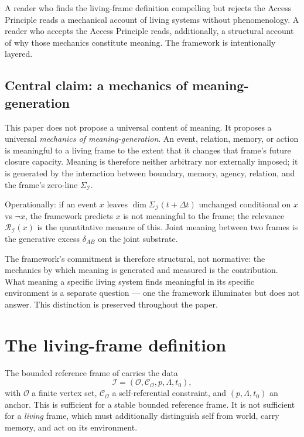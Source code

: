 \documentclass[11pt]{article}
\theoremstyle{plain}
\theoremstyle{definition}
\theoremstyle{remark}
\newcommand{\Ical}{\mathcal{I}}
\newcommand{\Ocal}{\mathcal{O}}
\newcommand{\Ccal}{\mathcal{C}}
\newcommand{\Rcal}{\mathcal{R}}
\begin{document}
A reader who finds the living-frame definition compelling but rejects the Access Principle reads a mechanical account of living systems without phenomenology. A reader who accepts the Access Principle reads, additionally, a structural account of why those mechanics constitute meaning. The framework is intentionally layered.

\subsection{Central claim: a mechanics of meaning-generation}\label{sec:central-claim}

This paper does not propose a universal content of meaning. It proposes
a universal \emph{mechanics of meaning-generation}. An event, relation,
memory, or action is meaningful to a living frame to the extent that it
changes that frame's future closure capacity. Meaning is therefore
neither arbitrary nor externally imposed; it is generated by the
interaction between boundary, memory, agency, relation, and the frame's
zero-line $\Sigma_\Ical$.

Operationally: if an event $x$ leaves $\dim \Sigma_\Ical(t + \Delta t)$
unchanged conditional on $x$ vs $\neg x$, the framework predicts $x$ is
not meaningful to the frame; the relevance $\Rcal_\Ical(x)$ is the
quantitative measure of this. Joint meaning between two frames is the
generative excess $\delta_{AB}$ on the joint substrate.

The framework's commitment is therefore structural, not normative: the
mechanics by which meaning is generated and measured is the contribution.
What meaning a specific living system finds meaningful in its
specific environment is a separate question --- one the framework
illuminates but does not answer. This distinction is preserved
throughout the paper.

\section{The living-frame definition}\label{sec:living-frame}

The bounded reference frame of \citet{SmartExistenceClosure} carries the data
\[
  \Ical = (\Ocal, \Ccal_\Ocal, p, \Lambda, t_0),
\]
with $\Ocal$ a finite vertex set, $\Ccal_\Ocal$ a self-referential constraint, and $(p, \Lambda, t_0)$ an anchor. This is sufficient for a stable bounded reference frame. It is not sufficient for a \emph{living} frame, which must additionally distinguish self from world, carry memory, and act on its environment.
\end{document}
